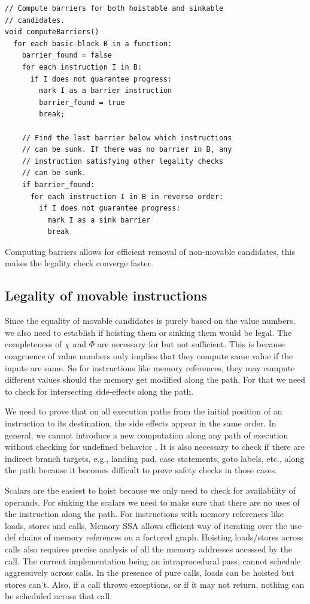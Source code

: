 \documentclass[sigplan,10pt,review,anonymous]{acmart}\settopmatter{printfolios=true,printccs=false,printacmref=false}
\begin{document}
\begin{lstlisting}
// Compute barriers for both hoistable and sinkable
// candidates.
void computeBarriers()
  for each basic-block B in a function:
    barrier_found = false
    for each instruction I in B:
      if I does not guarantee progress:
        mark I as a barrier instruction
        barrier_found = true
        break;

    // Find the last barrier below which instructions
    // can be sunk. If there was no barrier in B, any
    // instruction satisfying other legality checks
    // can be sunk.
    if barrier_found:
      for each instruction I in B in reverse order:
        if I does not guarantee progress:
          mark I as a sink barrier
          break
\end{lstlisting}

Computing barriers allows for efficient removal of non-movable candidates, this
makes the legality check converge faster.

\subsection{Legality of movable instructions}
\label{subsec:legality}
Since the equality of movable candidates is purely based on the value numbers,
we also need to establish if hoisting them or sinking them would be legal. The
completeness of $\chi$ and $\Phi$ are necessary for \GCM{} but not
sufficient. This is because congruence of value numbers only implies that they
compute same value if the inputs are same. So for instructions like memory
references, they may compute different values should the memory get modified
along the path. For that we need to check for intersecting side-effects along
the path.

We need to prove that on all execution paths from the initial position of an
instruction to its destination, the side effects appear in the same order. In
general, we cannot introduce a new computation along any path of execution
without checking for undefined behavior \cite{undef}. It is also necessary to
check if there are indirect branch targets, e.g., landing pad, case statements,
goto labels, etc., along the path because it becomes difficult to prove safety
checks in those cases.

Scalars are the easiest to hoist because we only need to check for availability
of operands. For sinking the scalars we need to make sure that there are no uses
of the instruction along the path. For instructions with memory references like
loads, stores and calls, Memory SSA allows efficient way of iterating over the
use-def chains of memory references on a factored graph. Hoisting loads/stores
across calls also requires precise analysis of all the memory addresses accessed
by the call. The current implementation being an intraprocedural pass, cannot
schedule aggressively across calls. In the presence of pure calls, loads can be
hoisted but stores can't. Also, if a call throws exceptions, or if it may not
return, nothing can be scheduled across that call.
\end{document}
